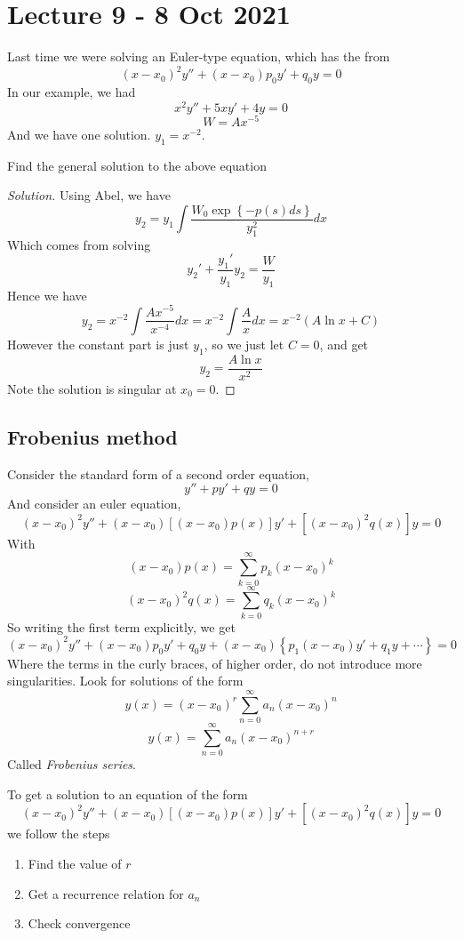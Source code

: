 \section{Lecture 9 - 8 Oct 2021}
Last time we were solving an Euler-type equation, which has the from
\[(x-x_0)^2 y'' + (x-x_0)p_0y' + q_0 y = 0 \]
In our example, we had
\[x^2 y'' + 5xy' + 4y = 0\]
\[W = Ax^{-5}\]
And we have one solution. $y_1 = x^{-2}$.
\begin{example}
  Find the general solution to the above equation
\end{example}
\begin{proof}[Solution]
  Using Abel, we have
  \[y_2 = y_1 \int \frac{W_0\exp \left\{ -p(s) ds \right\}}{y_1^{2}} dx\]
  Which comes from solving 
  \[y_2' + \frac{y_1'}{y_1} y_{2} = \frac{W}{y_1}\]
  Hence we have
  \[y_2 = x^{-2} \int \frac{Ax^{-5}}{x^{-4}} dx = x^{-2}\int \frac{A}{x} dx = x^{-2}(A\ln x + C)\]
  However the constant part is just $y_1$, so we just let $C=0$, and get
  \[y_2 = \frac{A\ln x}{x^2}\]
  Note the solution is singular at $x_0=0$.
\end{proof}

\subsection{Frobenius method}
Consider the standard form of a second order equation,
\[y'' + py' + q y = 0\]
And consider an euler equation, 
\[(x-x_0)^2 y'' + (x-x_0)[(x-x_0)p(x)] y' + [(x-x_0)^2 q(x)]y = 0\]
With
\[(x-x_0)p(x)= \sum_{k=0}^{\infty} p_k (x-x_0)^k\]
\[(x-x_0)^2q(x)= \sum_{k=0}^{\infty} q_k (x-x_0)^k\]
So writing the first term explicitly, we get
\[(x-x_0)^2 y'' + (x-x_0)p_0 y' + q_0 y + (x-x_0) \left\{ p_1(x-x_0)y' + q_1y + \cdots
\right\} = 0\]
Where the terms in the curly braces, of higher order, do not introduce more singularities.
Look for solutions of the form
\[y(x) = (x-x_0)^r \sum_{n=0}^{\infty} a_n(x-x_0)^n\]
\[y(x) = \sum_{n=0}^{\infty} a_n(x-x_0)^{n+r}\]
Called \emph{Frobenius series}.
\begin{definition}
  To get a solution to an equation of the form
  \[(x-x_0)^2 y'' + (x-x_0)[(x-x_0)p(x)] y' + [(x-x_0)^2 q(x)]y = 0\]
  we follow the steps
  \begin{enumerate}
    \item Find the value of $r$
    \item Get a recurrence relation for $a_n$
    \item Check convergence
  \end{enumerate}
  \label{frobeniusMethod}
\end{definition}

